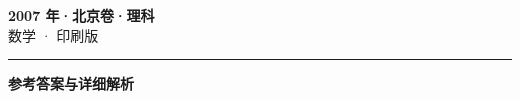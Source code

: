 \documentclass[zihao=5, a4paper]{ctexart}
\begin{document}
\begin{center}
  {\Large\bfseries 2007 年·北京卷·理科}\\[4pt]
  {\large 数学 · 印刷版}
\end{center}
\medskip
{}

\par\bigskip\hrule\bigskip
{}
\begin{center}{\large\bfseries 参考答案与详细解析}\end{center}
\smallskip

\end{document}
